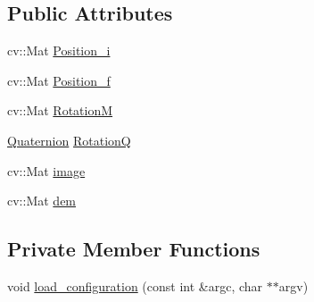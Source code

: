 \subsection*{\-Public \-Attributes}
\begin{DoxyCompactItemize}
\item 
cv\-::\-Mat \hyperlink{classOptions_a3e10b94a533d7e39670febca108715a6}{\-Position\-\_\-i}
\item 
cv\-::\-Mat \hyperlink{classOptions_a7923a7c748e5ab761e5fa1e1e1e6e3b9}{\-Position\-\_\-f}
\item 
cv\-::\-Mat \hyperlink{classOptions_a5e971c1699799f91159acf76602f1b4b}{\-Rotation\-M}
\item 
\hyperlink{classQuaternion}{\-Quaternion} \hyperlink{classOptions_a895916d9e2eb7d9ab7c292f39d4b94b9}{\-Rotation\-Q}
\item 
cv\-::\-Mat \hyperlink{classOptions_aaf69da675c15e1efb44642e8b4d6ebe5}{image}
\item 
cv\-::\-Mat \hyperlink{classOptions_ade4d872c50bd9b281c25010c8e68a3cb}{dem}
\end{DoxyCompactItemize}
\subsection*{\-Private \-Member \-Functions}
\begin{DoxyCompactItemize}
\item 
void \hyperlink{classOptions_a5176d195eb8d38718f6084835c652663}{load\-\_\-configuration} (const int \&argc, char $\ast$$\ast$argv)
\end{DoxyCompactItemize}
